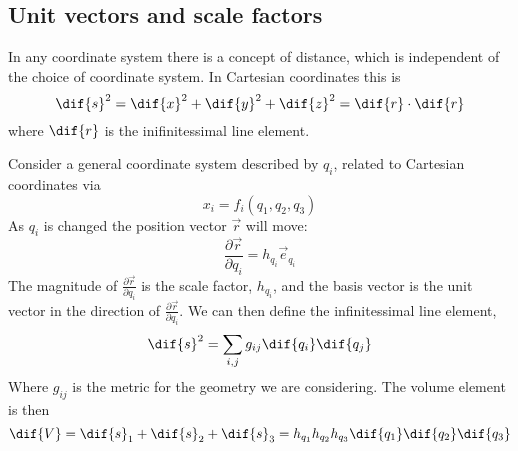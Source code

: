 \subsection{Unit vectors and scale factors}
\label{sec:unitsscale}

In any coordinate system there is a concept of distance, which is
independent of the choice of coordinate system.  In Cartesian
coordinates this is
\[ \dif{s}^2 = \dif{x}^2 + \dif{y}^2 + \dif{z}^2 = \dif{r}\cdot
\dif{r} \] where $\dif{r}$ is the inifinitessimal line element.

Consider a general coordinate system described by $q_i$, related to
Cartesian coordinates via
\[ x_i = f_i (q_1, q_2, q_3) \] As $q_i$ is changed the position
vector $\vec r$ will move:
\[ \frac{\partial \vec r}{\partial q_i} = h_{q_i} \vec{e}_{q_i} \] The
magnitude of $\frac{\partial \vec r}{\partial q_i}$ is the scale
factor, $h_{q_i}$, and the basis vector is the unit vector in the
direction of $\frac{\partial \vec r}{\partial q_i}$.  We can then
define the infinitessimal line element,
\begin{equation}
  \label{eq:infinitessimalcurve}
  \dif{s}^2 = \sum_{i, j} g_{ij} \dif{q_i} \dif{q_j}
\end{equation}
Where $g_{ij}$ is the metric for the geometry we are considering.  The
volume element is then
\begin{equation}
  \label{eq:volumecurvi}
  \dif{V} = \dif{s}_{1} + \dif{s}_2 + \dif{s}_3 = h_{q_1}h_{q_2}h_{q_3} \dif{q_1} \dif{q_2} \dif{q_3}
\end{equation}
